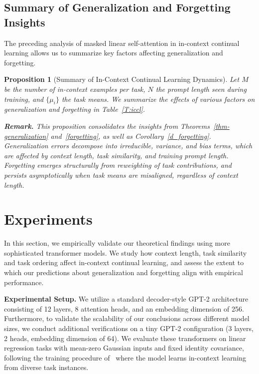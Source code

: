 \documentclass{article}
\theoremstyle{plain}
\newtheorem{proposition}[theorem]{Proposition}
\theoremstyle{definition}
\theoremstyle{remark}
\begin{document}
\subsection{Summary of Generalization and Forgetting Insights}
\label{sec:summary}

The preceding analysis of masked linear self-attention in in-context continual learning allows us to summarize key factors affecting generalization and forgetting.

\begin{proposition}[Summary of In-Context Continual Learning Dynamics]
\label{prop:summary}
Let $M$ be the number of in-context examples per task, $N$ the prompt length seen during training, and $\{\mu_i\}$ the task means. We summarize the effects of various factors on generalization and forgetting in Table~\ref{T:iccl}.

\noindent \textbf{Remark.}  
This proposition consolidates the insights from Theorems~\ref{thm-generalization} and~\ref{forgetting}, as well as Corollary~\ref{d_forgetting}. 
Generalization errors decompose into irreducible, variance, and bias terms, which are affected by context length, task similarity, and training prompt length.  
Forgetting emerges structurally from reweighting of task contributions, and persists asymptotically when task means are misaligned, regardless of context length.
\end{proposition}

\vspace{-0.1in}\section{Experiments}
In this section, we empirically validate our theoretical findings using more sophisticated transformer models. We study how context length, task similarity and task ordering affect in-context continual learning, and assess the extent to which our predictions about generalization and forgetting align with empirical performance.

\noindent \textbf{Experimental Setup.}
We utilize a standard decoder-style GPT-2 architecture consisting of 12 layers, 8 attention heads, and an embedding dimension of 256. Furthermore, to validate the scalability of our conclusions across different model sizes, we conduct additional verifications on a tiny GPT-2 configuration (3 layers, 2 heads, embedding dimension of 64). We evaluate these transformers on linear regression tasks with mean-zero Gaussian inputs and fixed identity covariance, following the training procedure of~\citet{garg2022what} where the model learns in-context learning from diverse task instances. 
\end{document}
